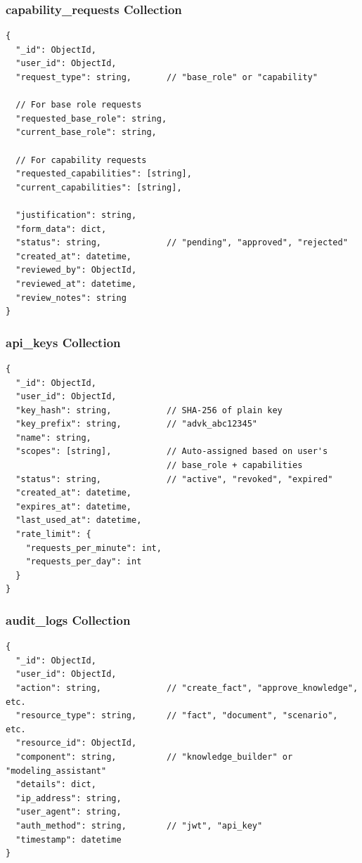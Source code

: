 \documentclass[12pt,a4paper]{article}
\begin{document}
\subsubsection{capability\_requests Collection}
\begin{verbatim}
{
  "_id": ObjectId,
  "user_id": ObjectId,
  "request_type": string,       // "base_role" or "capability"
  
  // For base role requests
  "requested_base_role": string,
  "current_base_role": string,
  
  // For capability requests
  "requested_capabilities": [string],
  "current_capabilities": [string],
  
  "justification": string,
  "form_data": dict,
  "status": string,             // "pending", "approved", "rejected"
  "created_at": datetime,
  "reviewed_by": ObjectId,
  "reviewed_at": datetime,
  "review_notes": string
}
\end{verbatim}

\subsubsection{api\_keys Collection}
\begin{verbatim}
{
  "_id": ObjectId,
  "user_id": ObjectId,
  "key_hash": string,           // SHA-256 of plain key
  "key_prefix": string,         // "advk_abc12345"
  "name": string,
  "scopes": [string],           // Auto-assigned based on user's 
                                // base_role + capabilities
  "status": string,             // "active", "revoked", "expired"
  "created_at": datetime,
  "expires_at": datetime,
  "last_used_at": datetime,
  "rate_limit": {
    "requests_per_minute": int,
    "requests_per_day": int
  }
}
\end{verbatim}

\subsubsection{audit\_logs Collection}
\begin{verbatim}
{
  "_id": ObjectId,
  "user_id": ObjectId,
  "action": string,             // "create_fact", "approve_knowledge", etc.
  "resource_type": string,      // "fact", "document", "scenario", etc.
  "resource_id": ObjectId,
  "component": string,          // "knowledge_builder" or "modeling_assistant"
  "details": dict,
  "ip_address": string,
  "user_agent": string,
  "auth_method": string,        // "jwt", "api_key"
  "timestamp": datetime
}
\end{verbatim}
\end{document}
